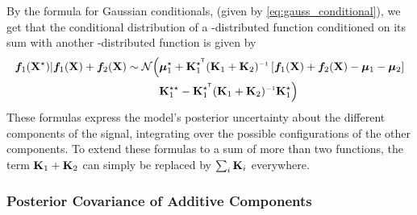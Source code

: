 By the formula for Gaussian conditionals, (given by \cref{eq:gauss_conditional}), we get that the conditional distribution of a \gp{}-distributed function conditioned on its sum with another \gp{}-distributed function is given by
%
\begin{align}
\vf_1(\vX^\star) | \vf_1(\vX) + \vf_2(\vX) \sim \Normal \Big( 
& \vmu_1^\star + \vK_1^{\star\tra} (\vK_1 + \vK_2)\inv \left[ \vf_1(\vX) + \vf_2(\vX) - \vmu_1 - \vmu_2 \right] \nonumber \\
& \vK_1^{\star\star} - \vK_1^{\star\tra} (\vK_1 + \vK_2)\inv \vK_1^{\star} \Big)
\end{align}
%
These formulas express the model's posterior uncertainty about the different components of the signal, integrating over the possible configurations of the other components.
To extend these formulas to a sum of more than two functions, the term $\mathbf{K}_1 + \mathbf{K}_2$ can simply be replaced by $\sum_i \mathbf{K}_i$ everywhere.




\subsubsection{Posterior Covariance of Additive Components}

